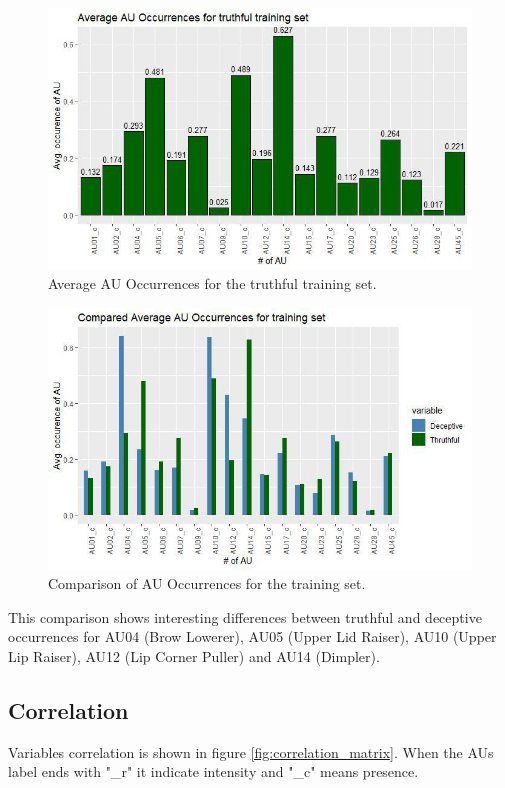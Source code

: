 \begin{figure}[H]
	\centering
	\includegraphics[width=1\textwidth]{images/au_occ_truth}
	\caption{Average AU Occurrences for the truthful training set.}
	\label{fig:au_occ_truth}
\end{figure}

\begin{figure}[H]
	\centering
	\includegraphics[width=1\textwidth]{images/au_occ_comp}
	\caption{Comparison of AU Occurrences for the training set.}
	\label{fig:au_occ_comp}
\end{figure}

This comparison shows interesting differences between truthful and deceptive occurrences for AU04 (Brow Lowerer), AU05 (Upper Lid Raiser), AU10 (Upper Lip Raiser), AU12 (Lip Corner Puller) and AU14 (Dimpler). %

\subsection{Correlation} \label{corr}
Variables correlation is shown in figure \ref{fig:correlation_matrix}. When the AUs label ends with "\_r" it indicate intensity and "\_c" means presence.

